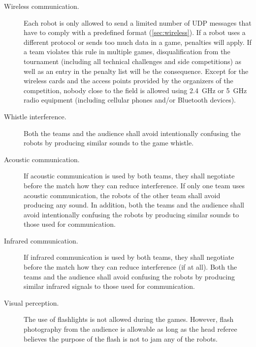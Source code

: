\begin{description}

  \item[Wireless communication.] Each robot is only allowed to send a limited number of UDP messages that have to comply with a predefined format (\cf \cref{sec:wireless}). If a robot uses a different protocol or sends too much data in a game, penalties will apply. If a team violates this rule in multiple games, disqualification from the tournament (including all technical challenges and side competitions) as well as an entry in the penalty list will be the consequence. Except for the wireless cards and the access points provided by the organizers of the competition, nobody close to the field is allowed using \qty{2.4}{\giga\hertz} or \qty{5}{\giga\hertz} radio equipment (including cellular phones and/or Bluetooth devices).

  \item[Whistle interference.] Both the teams and the audience shall avoid intentionally confusing the robots by producing similar sounds to the game whistle.

  \item[Acoustic communication.] If acoustic communication is used by both teams, they shall negotiate before the match how they can reduce interference. If only one team uses acoustic communication, the robots of the other team shall avoid producing any sound. In addition, both the teams and the audience shall avoid intentionally confusing the robots by producing similar sounds to those used for communication.

  \item[Infrared communication.] If infrared communication is used by both teams, they shall negotiate before the match how they can reduce interference (if at all). Both the teams and the audience shall avoid confusing the robots by producing similar infrared signals to those used for communication.

  \item[Visual perception.] The use of flashlights is not allowed during the games.  However, flash photography from the audience is allowable as long as the head referee believes the purpose of the flash is not to jam any of the robots.

\end{description}
